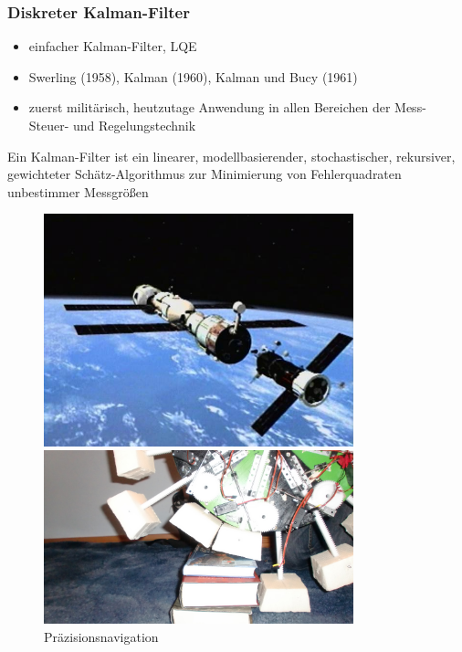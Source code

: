 \documentclass[10pt,a4paper,oneside]{beamer}
\begin{document}
\begin{frame}
  \frametitle{Diskreter Kalman-Filter}
  \begin{itemize}
  	  \item einfacher Kalman-Filter, LQE
	  \item Swerling (1958), Kalman (1960), Kalman und Bucy (1961)
	  \item zuerst militärisch, heutzutage Anwendung in allen Bereichen der Mess- Steuer- und Regelungstechnik
  \end{itemize}
  \begin{definition}
  	Ein Kalman-Filter ist ein linearer, modellbasierender, stochastischer, rekursiver, gewichteter Schätz-Algorithmus zur Minimierung von Fehlerquadraten unbestimmer Messgrößen
  \end{definition}
  \begin{figure}[htbp]
        \begin{minipage}{0.3\textwidth}
         \centering
          \includegraphics[width=0.8\textwidth]{images/docking.jpg}
          \caption{Präzisionsnavigation}
        \end{minipage}\hfill
        \begin{minipage}{0.3\textwidth}
         \centering
          \includegraphics[width=0.8\textwidth]{images/smartwheel.jpg}

\end{minipage}
\end{figure}
\end{frame}
\end{document}
